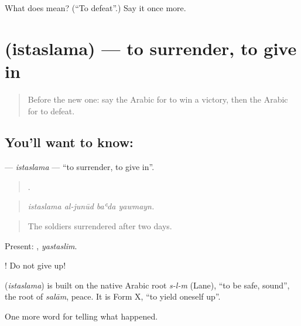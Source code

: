 \begin{tcolorbox}[breakable,colback=teal!4,colframe=teal!35!black,title={Before you move on}]
What does  mean? (\textquotedblleft{}To defeat\textquotedblright{}.) Say it once more.
\end{tcolorbox}
\section[\texorpdfstring{\ar{استسلم} (istaslama)}{استسلم (istaslama)}]{ (istaslama) — to surrender, to give in}

\label{lesson:AR-C315-istaslama}



\begin{quote}
Before the new one: say the Arabic for to win a victory, then the Arabic for to defeat.
\end{quote}

\subsection*{You'll want to know: }
\textbf{} — \emph{istaslama} — \textquotedblleft{}to surrender, to give in\textquotedblright{}.

\begin{quote}
   .
\end{quote}

\begin{quote}
\emph{istaslama al-junūd baʿda yawmayn.}
\end{quote}

\begin{quote}
The soldiers surrendered after two days.
\end{quote}

Present: , \emph{yastaslim}.

 ! Do not give up!

\begin{cousinweb}
\textbf{} (\emph{istaslama}) is built on the native Arabic root \emph{s-l-m} (Lane), \textquotedblleft{}to be safe, sound\textquotedblright{}, the root of \emph{salām}, peace. It is Form X, \textquotedblleft{}to yield oneself up\textquotedblright{}.
\end{cousinweb}

\begin{grammarlens}[title={What you've built}]
One more word for telling what happened.
\end{grammarlens}

